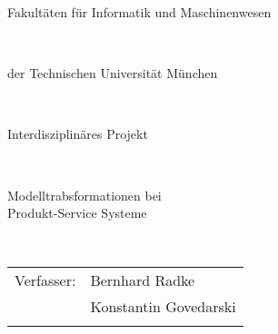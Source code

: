 \frontmatter
\pagestyle{empty}

\begin{titlepage}

%
\begin{center}
\begin{huge}
Fakult\"aten f\"ur Informatik und Maschinenwesen
\end{huge}\\
\vspace{4mm}
\begin{Large}
der Technischen Universit\"at M\"unchen
\end{Large}\\
\vspace{2.5cm}
\begin{Large}
Interdisziplin\"ares Projekt
\vspace{2.75cm}
\end{Large}\\
\begin{huge}
Modelltrabsformationen bei\\\vspace{5mm} Produkt-Service Systeme
\end{huge}\\
\vspace{1.25cm}
\begin{large}
\begin{tabular}{ll}
\vspace{0.1in}
Verfasser:& Bernhard Radke\\
\vspace{0.2in}
& Konstantin Govedarski\\
\vspace{0.2in}

\end{tabular}
\end{large}
\end{center}
\end{titlepage}
